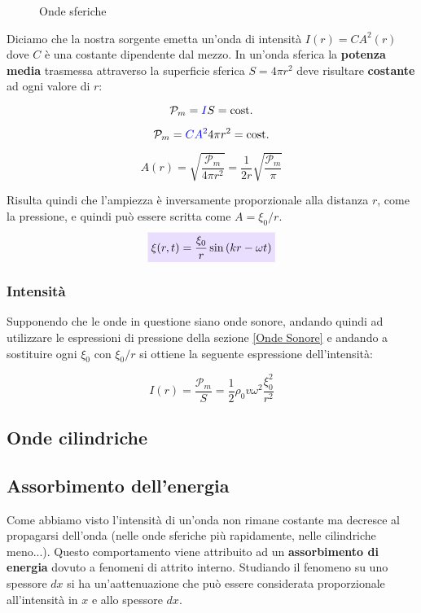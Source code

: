 \documentclass[x11names]{article}
\newcommand{\incfig}[1]{%
	\def\svgwidth{\columnwidth}
	{#1.pdf_tex}
}
\newcommand{\viola}[1]{\colorbox{yred}{$\displaystyle #1$}}
\begin{document}
	\begin{figure}[ht]
		\centering
		\scalebox{.7}{\incfig{sfera}}
		\caption{Onde sferiche}
		\label{fig:Onde sferiche}
	\end{figure}
	
	\noindent
	Diciamo che la nostra sorgente emetta un'onda di intensità \(I(r) = CA^2(r)\) dove \(C\) è una costante dipendente dal mezzo. In un'onda sferica la \textbf{potenza media} trasmessa attraverso la superficie sferica \(S = 4\pi r^2\) deve risultare \textbf{costante} ad ogni valore di \(r\):
	
	\[ 
	\mathcal{P}_m = \textcolor{blue}{I}S = \text{cost.}
	\] 
	
	\[ 
	\mathcal{P}_m = \textcolor{blue}{CA^2}4\pi r^2 = \text{cost.}
	\]
	
	\[ 
	A(r) = \sqrt{\frac{\mathcal{P}_m}{4\pi r^2}} = \frac{1}{2r}\sqrt{\frac{\mathcal{P}_m}{\pi}}
	\]

	\noindent
	Risulta quindi che l'ampiezza è inversamente proporzionale alla distanza \(r\), come la pressione, e quindi può essere scritta come \(A = \xi_0 /r\).
	\begin{equation}
		\viola{\xi(r,t) = \frac{\xi_0}{r}\sin\left(kr -\omega t\right)}
	\end{equation}
	
	\subsubsection{Intensità}
	Supponendo che le onde in questione siano onde sonore, andando quindi ad utilizzare le espressioni di pressione della sezione \ref{Onde Sonore} e andando a sostituire ogni \(\xi_0\) con \(\xi_0/r\) si ottiene la seguente espressione dell'intensità:
	
	\[ 
	I(r) = \frac{\mathcal{P}_m}{S} = \frac{1}{2} \rho_0 v \omega ^2 \frac{\xi_0^2}{r^2}
	\]
	
	\subsection{Onde cilindriche}
	


	\newpage
	\subsection{Assorbimento dell'energia}
	Come abbiamo visto l'intensità di un'onda non rimane costante ma decresce al propagarsi dell'onda (nelle onde sferiche più rapidamente, nelle cilindriche meno...). Questo comportamento viene attribuito ad un \textbf{assorbimento di energia} dovuto a fenomeni di attrito interno. Studiando il fenomeno su uno spessore \(dx\) si ha un'aattenuazione che può essere considerata proporzionale all'intensità in \(x\) e allo spessore \(dx\).
	
\end{document}
